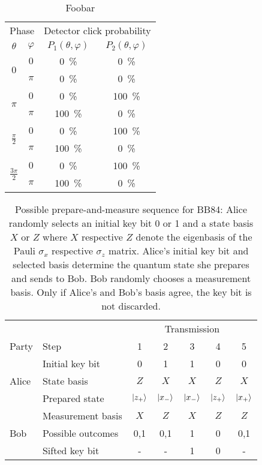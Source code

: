 \begin{table}[htb]
	\centering
	\begin{tabular}{cccc}
		\toprule
		\multicolumn{2}{c}{Phase} & \multicolumn{2}{c}{Detector click probability} \\
		\cmidrule{1-2}
		\cmidrule{3-4}
		$\theta$ & $\varphi$ & $P_1(\theta,\varphi)$ & $P_2(\theta,\varphi)$ \\
		\midrule
		\multirow{2}{*}{$0$} & $0$ & \SI{0}{\percent} & \SI{0}{\percent} \\
		& $\pi$ & \SI{0}{\percent} & \SI{0}{\percent} \\
		\cmidrule{1-2}
		\multirow{2}{*}{$\pi$} & $0$ & \SI{0}{\percent} & \SI{100}{\percent} \\
		& $\pi$ & \SI{100}{\percent} & \SI{0}{\percent} \\
		\cmidrule{1-2}
		\multirow{2}{*}{$\frac{\pi}{2}$} & $0$ & \SI{0}{\percent} & \SI{100}{\percent} \\
		& $\pi$ & \SI{100}{\percent} & \SI{0}{\percent} \\
		\cmidrule{1-2}
		\multirow{2}{*}{$\frac{3\pi}{2}$} & $0$ & \SI{0}{\percent} & \SI{100}{\percent} \\
		& $\pi$ & \SI{100}{\percent} & \SI{0}{\percent} \\
		\bottomrule
	\end{tabular}
	\caption{Foobar}
\end{table}
\begin{table}[htb]
	\centering
	\begin{tabular}{llccccc}
		\toprule
		& & \multicolumn{5}{c}{Transmission} \\
		\cmidrule{3-7}
		Party & Step & 1 & 2 & 3 & 4 & 5 \\ 
		\midrule
		\multirow{3}{*}{Alice} & Initial key bit & \num{0} & \num{1} & \num{1} & \num{0} & \num{0} \\
		& State basis & $Z$ & $X$ & $X$ & $Z$ & $X$ \\
		& Prepared state & $\ket{z_+}$ & $\ket{x_-}$ & $\ket{x_-}$ & $\ket{z_+}$ & $\ket{x_+}$ \\
		\cmidrule{1-1}
		\multirow{3}{*}{Bob} & Measurement basis & $X$ & $Z$ & $X$ & $Z$ & $Z$ \\
		& Possible outcomes & \num{0},\num{1} & \num{0},\num{1} & \num{1} & \num{0} & \num{0},\num{1} \\
		& Sifted key bit & - & - & 1 & 0 & - \\
		\bottomrule
	\end{tabular}
	\caption{Possible prepare-and-measure sequence for BB84: Alice randomly selects an initial key bit \num{0} or \num{1} and a state basis $X$ or $Z$ where $X$ respective $Z$ denote the eigenbasis of the Pauli $\sigma_x$ respective $\sigma_z$ matrix. Alice's initial key bit and selected basis determine the quantum state she prepares and sends to Bob. Bob randomly chooses a measurement basis. Only if Alice's and Bob's basis agree, the key bit is not discarded.}
\end{table}
